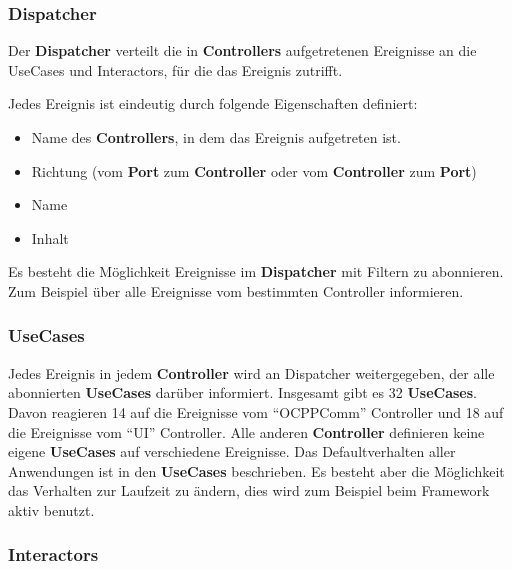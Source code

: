 \subsubsection{Dispatcher}
Der \textbf{Dispatcher} verteilt die in \textbf{Controllers} aufgetretenen Ereignisse an die UseCases und Interactors, für die das Ereignis zutrifft.

Jedes Ereignis ist eindeutig durch folgende Eigenschaften definiert:
\begin{itemize}
    \item Name des \textbf{Controllers}, in dem das Ereignis aufgetreten ist.
    \item Richtung (vom \textbf{Port} zum \textbf{Controller} oder vom \textbf{Controller} zum \textbf{Port})
    \item Name
    \item Inhalt
\end{itemize}

Es besteht die Möglichkeit Ereignisse im \textbf{Dispatcher} mit Filtern zu abonnieren. 
Zum Beispiel über alle Ereignisse vom bestimmten Controller informieren.

\subsubsection{UseCases}

Jedes Ereignis in jedem \textbf{Controller} wird an Dispatcher weitergegeben, der alle abonnierten \textbf{UseCases} darüber informiert.
Insgesamt gibt es 32 \textbf{UseCases}. 
Davon reagieren 14 auf die Ereignisse vom ``OCPPComm'' Controller und 18 auf die Ereignisse vom ``UI'' Controller. 
Alle anderen \textbf{Controller} definieren keine eigene \textbf{UseCases} auf verschiedene Ereignisse.
Das Defaultverhalten aller Anwendungen ist in den \textbf{UseCases} beschrieben. Es besteht aber die Möglichkeit das Verhalten zur Laufzeit zu ändern, 
dies wird zum Beispiel beim Framework aktiv benutzt.

\newpage
\subsubsection{Interactors}

